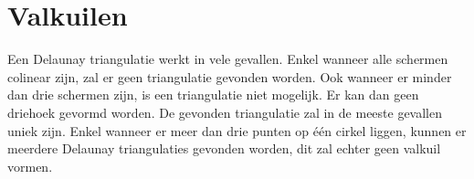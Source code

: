 \section{Valkuilen}
Een Delaunay triangulatie werkt in vele gevallen. Enkel wanneer alle schermen colinear zijn, zal er geen triangulatie gevonden worden. Ook wanneer er minder dan drie schermen zijn, is een triangulatie niet mogelijk. Er kan dan geen driehoek gevormd worden.
De gevonden triangulatie zal in de meeste gevallen uniek zijn. Enkel wanneer er meer dan drie punten op één cirkel liggen, kunnen er meerdere Delaunay triangulaties gevonden worden, dit zal echter geen valkuil vormen.
